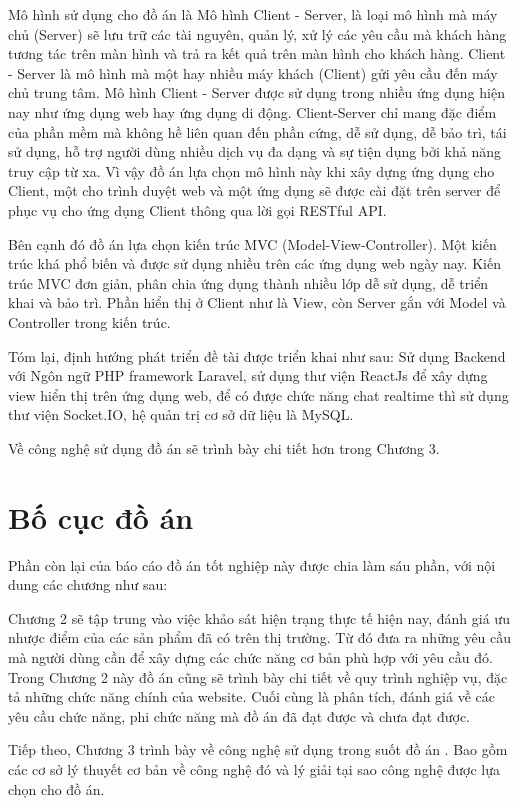 \documentclass[../DoAn.tex]{subfiles}
\begin{document}
Mô hình sử dụng cho đồ án là Mô hình Client  - Server, là loại mô hình mà máy chủ (Server) sẽ lưu trữ các tài nguyên, quản lý,  xử lý các yêu cầu mà khách hàng tương tác trên màn hình và trả ra kết quả trên màn hình cho khách hàng. Client  - Server là mô hình mà một hay nhiều máy khách (Client) gửi yêu cầu đến máy chủ trung tâm\cite{ClientServer}. Mô hình Client - Server được sử dụng trong nhiều ứng dụng hiện nay như ứng dụng web hay ứng dụng di động. Client-Server chỉ mang đặc điểm của phần mềm mà không hề liên quan đến phần cứng, dễ sử dụng, dễ bảo trì, tái sử dụng, hỗ trợ người dùng nhiều dịch vụ đa dạng và sự tiện dụng bởi khả năng truy cập từ xa. Vì vậy đồ án lựa chọn mô hình này khi xây dựng ứng dụng cho Client, một cho trình duyệt web và một ứng dụng sẽ được cài đặt trên server để phục vụ cho ứng dụng Client thông qua lời gọi RESTful API. 

Bên cạnh đó đồ án lựa chọn kiến trúc MVC (Model-View-Controller). Một kiến trúc khá phổ biến và được sử dụng nhiều trên các ứng dụng web ngày nay. Kiến trúc MVC đơn giản, phân chia ứng dụng thành nhiều lớp dễ sử dụng, dễ triển khai và bảo trì. Phần hiển thị ở Client như là View, còn Server gắn với Model và Controller trong kiến trúc.

Tóm lại, định hướng phát triển đề tài được triển khai như sau: Sử dụng Backend với Ngôn ngữ PHP framework Laravel, sử dụng thư viện ReactJs để xây dựng view hiển thị trên ứng dụng web, để có được chức năng chat realtime thì sử dụng thư viện Socket.IO, hệ quản trị cơ sở dữ liệu là MySQL.

Về công nghệ sử dụng đồ án sẽ trình bày chi tiết hơn trong Chương 3.
\section{Bố cục đồ án}
\label{section:1.4}
Phần còn lại của báo cáo đồ án tốt nghiệp này được chia làm sáu phần, với nội dung các chương như sau: 

Chương 2 sẽ tập trung vào việc khảo sát hiện trạng thực tế hiện nay, đánh giá ưu nhược điểm của các sản phẩm đã có trên thị trường. Từ đó đưa ra những yêu cầu mà người dùng cần để xây dựng các chức năng cơ bản phù hợp với yêu cầu đó. Trong Chương 2 này đồ án cũng sẽ trình bày chi tiết về quy trình nghiệp vụ, đặc tả những chức năng chính của website. Cuối cùng là phân tích, đánh giá về các yêu cầu chức năng, phi chức năng mà đồ án đã đạt được và chưa đạt được.

Tiếp theo, Chương 3 trình bày về công nghệ sử dụng trong suốt đồ án . Bao gồm các cơ sở lý thuyết cơ bản về công nghệ đó và lý giải tại sao công nghệ được lựa chọn cho đồ án. 
\end{document}
